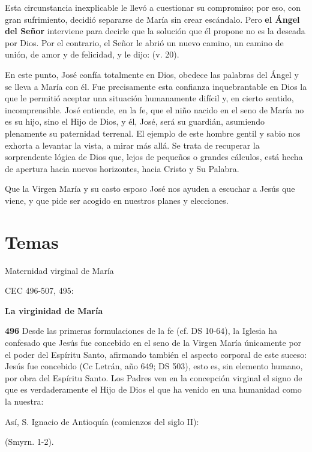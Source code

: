 Esta circunstancia inexplicable le llevó a cuestionar su compromiso; por eso, con gran sufrimiento, decidió separarse de María sin crear escándalo. Pero \textbf{el Ángel del Señor} interviene para decirle que la solución que él propone no es la deseada por Dios. Por el contrario, el Señor le abrió un nuevo camino, un camino de unión, de amor y de felicidad, y le dijo:  (v. 20).

En este punto, José confía totalmente en Dios, obedece las palabras del Ángel y se lleva a María con él. Fue precisamente esta confianza inquebrantable en Dios la que le permitió aceptar una situación humanamente difícil y, en cierto sentido, incomprensible. José entiende, en la fe, que el niño nacido en el seno de María no es su hijo, sino el Hijo de Dios, y él, José, será su guardián, asumiendo plenamente su paternidad terrenal. El ejemplo de este hombre gentil y sabio nos exhorta a levantar la vista, a mirar más allá. Se trata de recuperar la sorprendente lógica de Dios que, lejos de pequeños o grandes cálculos, está hecha de apertura hacia nuevos horizontes, hacia Cristo y Su Palabra.

Que la Virgen María y su casto esposo José nos ayuden a escuchar a Jesús que viene, y que pide ser acogido en nuestros planes y elecciones.

\section{Temas}

Maternidad virginal de María

CEC 496-507, 495:

\textbf{La virginidad de María}

\textbf{496} Desde las primeras formulaciones de la fe (cf. DS 10-64), la Iglesia ha confesado que Jesús fue concebido en el seno de la Virgen María únicamente por el poder del Espíritu Santo, afirmando también el aspecto corporal de este suceso: Jesús fue concebido  (Cc Letrán, año 649; DS 503), esto es, sin elemento humano, por obra del Espíritu Santo. Los Padres ven en la concepción virginal el signo de que es verdaderamente el Hijo de Dios el que ha venido en una humanidad como la nuestra:

Así, S. Ignacio de Antioquía (comienzos del siglo II):

 (Smyrn. 1-2).


